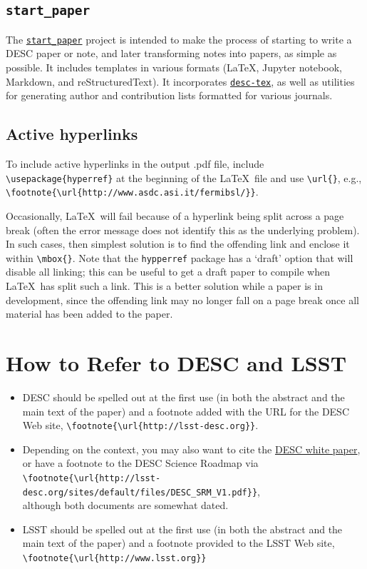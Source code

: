 \documentclass[letterpaper,11pt]{article}
\begin{document}
\subsection{\tt start\_paper}

The \href{https://github.com/LSSTDESC/start_paper}{\tt start\_paper} project is intended to make the process of starting to write a DESC paper or note, and later transforming notes into papers, as simple as possible. It includes templates in various formats (La\TeX, Jupyter notebook, Markdown, and reStructuredText). It incorporates \href{https://github.com/LSSTDESC/desc-tex}{\tt desc-tex}, as well as utilities for generating author and contribution lists formatted for various journals.

\subsection{Active hyperlinks}

To include active hyperlinks in the output .pdf file, include 
\verb|\usepackage{hyperref}| at the beginning of the La\TeX\ file and use
\verb|\url{}|, e.g., \verb|\footnote{\url{http://www.asdc.asi.it/fermibsl/}}|.

Occasionally, La\TeX\ will fail because of a hyperlink being split across
a page break (often the error message does not identify this as the underlying problem). In such cases, then simplest solution is to find the
offending link and enclose it within \verb|\mbox{}|. Note that the {\tt hypperref} package has a `draft' option that will disable all linking; this can be useful to get a draft paper to compile when La\TeX\ has split such a link. This is a better solution while a paper is in development, since the offending link may no longer fall on a page break once all material has been added to the paper.

\section{How to Refer to DESC and LSST} 

\begin{itemize}
\item{DESC should be spelled out at the first use (in both the abstract and the main text of the paper) and a footnote added with the URL for the DESC Web site, \verb|\footnote{\url{http://lsst-desc.org}}|.}
  
\item{Depending on the context, you may also want to cite the \href{http://adsabs.harvard.edu/abs/2012arXiv1211.0310L}{DESC white paper}, or have a footnote to the DESC Science Roadmap via \\\verb|\footnote{\url{http://lsst-desc.org/sites/default/files/DESC_SRM_V1.pdf}}|, \\although both documents are somewhat dated.}

\item{LSST should be spelled out at the first use (in both the abstract and the main text of the paper) and a footnote provided to the LSST Web site, \verb|\footnote{\url{http://www.lsst.org}}|}

\end{itemize}
\end{document}
